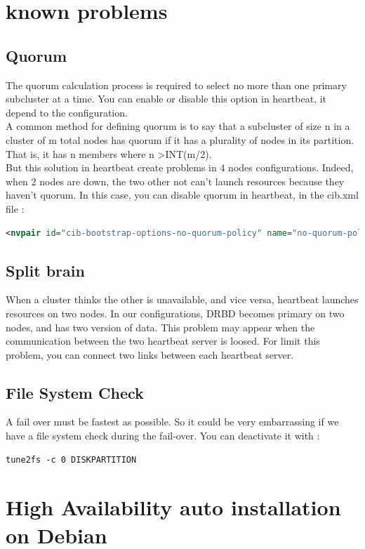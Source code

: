 \documentclass[a4paper,10pt]{report}
\begin{document}
\chapter{known problems}
\section{Quorum}
The quorum calculation process is required to select no more than one primary subcluster at a time. You can enable or disable this option in heartbeat, it depend to the configuration.\\
A common method for defining quorum is to say that a subcluster of size n in a cluster of m total nodes has quorum if it has a plurality of nodes in its partition. That is, it has n members where n \textgreater INT(m/2).\\
But this solution in heartbeat create problems in 4 nodes configurations. Indeed, when 2 nodes are down, the two other not can't launch resources because they haven't quorum. In this case, you
can disable quorum in heartbeat, in the cib.xml file :
\begin{lstlisting}[language=xml]
<nvpair id="cib-bootstrap-options-no-quorum-policy" name="no-quorum-policy" value="ignore"/>
\end{lstlisting}


\section{Split brain}
\label{splitbrain} 
When a cluster thinks the other is unavailable, and vice versa, heartbeat launches resources on two nodes. In our configurations, DRBD becomes primary on two nodes, and has two version of data. This problem may appear when the communication between the two heartbeat server is loosed.
For limit this problem, you can connect two links between each heartbeat server.



\section{File System Check}
A fail over must be fastest as possible. So it could be very embarrassing if we have a file system check during the fail-over. You can deactivate it with :
\begin{lstlisting}
tune2fs -c 0 DISKPARTITION
\end{lstlisting}

\chapter{High Availability auto installation on Debian}
\end{document}
